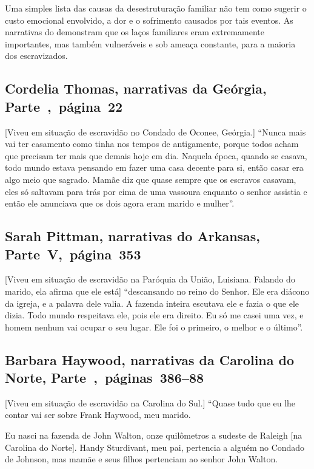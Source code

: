 {Uma simples lista das causas da desestruturação familiar não tem
como sugerir o custo emocional envolvido, a dor e o sofrimento causados
por tais eventos. As narrativas do  demonstram que os laços
familiares eram extremamente importantes, mas também vulneráveis e sob
ameaça constante, para a maioria dos escravizados.
}

\subsection{Cordelia Thomas, narrativas da Geórgia, Parte~,~página~22}

{[}Viveu em situação de escravidão no Condado de Oconee, Geórgia.{]} ``Nunca mais vai ter casamento como tinha nos tempos de antigamente,
porque todos acham que precisam ter mais que demais hoje em dia. Naquela
época, quando se casava, todo mundo estava pensando em fazer uma casa
decente para si, então casar era algo meio que sagrado. Mamãe diz que
quase sempre que os escravos casavam, eles só saltavam para trás por
cima de uma vassoura enquanto o senhor assistia e então ele anunciava
que os dois agora eram marido e mulher''.

\subsection{Sarah Pittman, narrativas do Arkansas, Parte~V,~página~353}

{[}Viveu em situação de escravidão na Paróquia da União, Luisiana. Falando do marido, ela afirma que ele está{]} ``descansando no reino
do Senhor. Ele era diácono da igreja, e a palavra dele valia. A fazenda
inteira escutava ele e fazia o que ele dizia. Todo mundo respeitava ele,
pois ele era direito. Eu só me casei uma vez, e homem nenhum vai ocupar
o seu lugar. Ele foi o primeiro, o melhor e o último''.

\subsection{Barbara Haywood, narrativas da Carolina do Norte, Parte~,~páginas~386--88}
\label{ref131}

{[}Viveu em situação de escravidão na Carolina do Sul.{]} ``Quase tudo que eu lhe contar vai ser sobre Frank Haywood, meu marido.

Eu nasci na fazenda de John Walton, onze quilômetros a sudeste de
Raleigh {[}na Carolina do Norte{]}. Handy Sturdivant, meu pai, pertencia
a alguém no Condado de Johnson, mas mamãe e seus filhos pertenciam ao
senhor John Walton.

